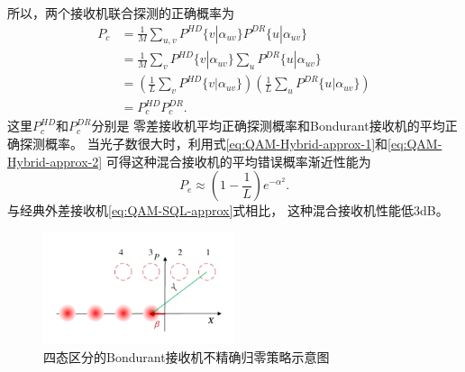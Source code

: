 所以，两个接收机联合探测的正确概率为
\begin{equation}
\begin{split}
P_c &= \frac{1}{M} \sum_{u,v} P^{HD}\{v| \alpha_{uv}\} P^{DR}\{u|\alpha_{uv}\} \\
    &= \frac{1}{M} \sum_v P^{HD}\{v| \alpha_{uv}\} \sum_u P^{DR}\{u|\alpha_{uv}\} \\
    &= \left( \frac{1}{L} \sum_v P^{HD}\{v| \alpha_{uv}\} \right) \left( \frac{1}{L} \sum_u P^{DR}\{u|\alpha_{uv}\} \right) \\
    &= P_c^{HD} P_c^{DR}.
\end{split}
\end{equation}
这里$P_c^{HD}$和$P_c^{DR}$分别是
零差接收机平均正确探测概率和Bondurant接收机的平均正确探测概率。
当光子数很大时，利用式\ref{eq:QAM-Hybrid-approx-1}和\ref{eq:QAM-Hybrid-approx-2}
可得这种混合接收机的平均错误概率渐近性能为
\begin{equation}
P_e \approx (1-\frac{1}{L}) e^{-\alpha^2}.
\end{equation}
与经典外差接收机\ref{eq:QAM-SQL-approx}式相比，
这种混合接收机性能低3dB。


\begin{figure}
\centering
  \includegraphics[width=0.5\textwidth]{figures/chap3/Opti-displacement}
  \caption{四态区分的Bondurant接收机不精确归零策略示意图}
  \label{fig:Opti-displacement}
\end{figure}


